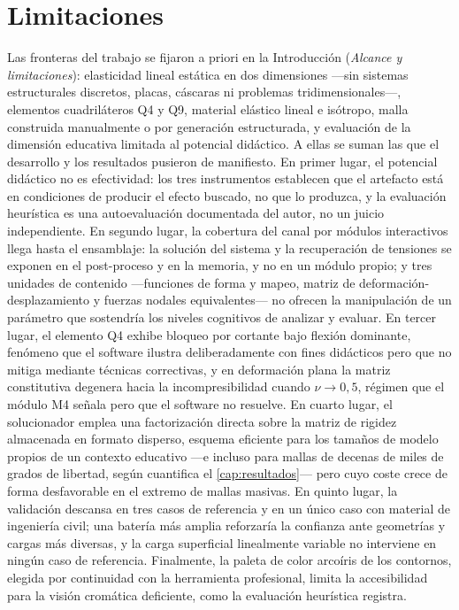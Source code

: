 \section*{Limitaciones}

Las fronteras del trabajo se fijaron a priori en la Introducción (\emph{Alcance y limitaciones}): elasticidad lineal estática en dos dimensiones —sin sistemas estructurales discretos, placas, cáscaras ni problemas tridimensionales—, elementos cuadriláteros Q4 y Q9, material elástico lineal e isótropo, malla construida manualmente o por generación estructurada, y evaluación de la dimensión educativa limitada al potencial didáctico. A ellas se suman las que el desarrollo y los resultados pusieron de manifiesto. En primer lugar, el potencial didáctico no es efectividad: los tres instrumentos establecen que el artefacto está en condiciones de producir el efecto buscado, no que lo produzca, y la evaluación heurística es una autoevaluación documentada del autor, no un juicio independiente. En segundo lugar, la cobertura del canal por módulos interactivos llega hasta el ensamblaje: la solución del sistema y la recuperación de tensiones se exponen en el post-proceso y en la memoria, y no en un módulo propio; y tres unidades de contenido —funciones de forma y mapeo, matriz de deformación-desplazamiento y fuerzas nodales equivalentes— no ofrecen la manipulación de un parámetro que sostendría los niveles cognitivos de analizar y evaluar. En tercer lugar, el elemento Q4 exhibe bloqueo por cortante bajo flexión dominante, fenómeno que el software ilustra deliberadamente con fines didácticos pero que no mitiga mediante técnicas correctivas, y en deformación plana la matriz constitutiva degenera hacia la incompresibilidad cuando $\nu \to 0{,}5$, régimen que el módulo M4 señala pero que el software no resuelve. En cuarto lugar, el solucionador emplea una factorización directa sobre la matriz de rigidez almacenada en formato disperso, esquema eficiente para los tamaños de modelo propios de un contexto educativo ---e incluso para mallas de decenas de miles de grados de libertad, según cuantifica el \autoref{cap:resultados}--- pero cuyo coste crece de forma desfavorable en el extremo de mallas masivas. En quinto lugar, la validación descansa en tres casos de referencia y en un único caso con material de ingeniería civil; una batería más amplia reforzaría la confianza ante geometrías y cargas más diversas, y la carga superficial linealmente variable no interviene en ningún caso de referencia. Finalmente, la paleta de color arcoíris de los contornos, elegida por continuidad con la herramienta profesional, limita la accesibilidad para la visión cromática deficiente, como la evaluación heurística registra.

